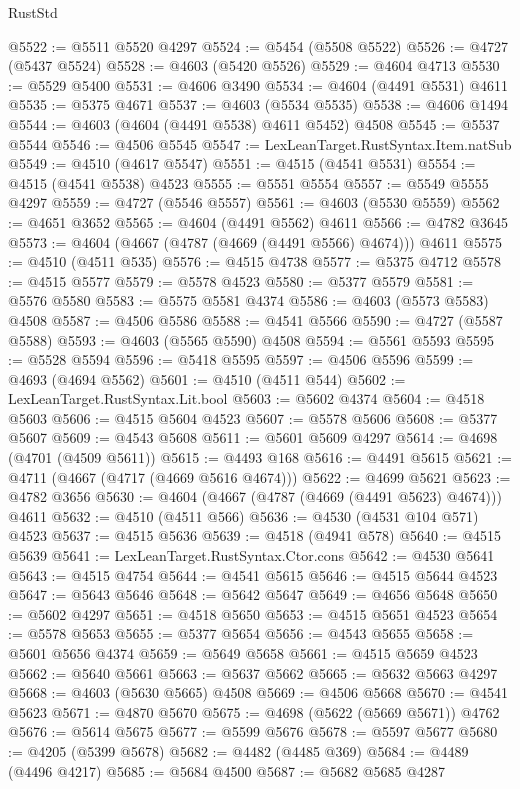 \begin{lexlean}{RustStd}
\begin{coremodule}
@5522 := @5511 @5520 @4297
@5524 := @5454 (@5508 @5522)
@5526 := @4727 (@5437 @5524)
@5528 := @4603 (@5420 @5526)
@5529 := @4604 @4713
@5530 := @5529 @5400
@5531 := @4606 @3490
@5534 := @4604 (@4491 @5531) @4611
@5535 := @5375 @4671
@5537 := @4603 (@5534 @5535)
@5538 := @4606 @1494
@5544 := @4603 (@4604 (@4491 @5538) @4611 @5452) @4508
@5545 := @5537 @5544
@5546 := @4506 @5545
@5547 := LexLeanTarget.RustSyntax.Item.natSub
@5549 := @4510 (@4617 @5547)
@5551 := @4515 (@4541 @5531)
@5554 := @4515 (@4541 @5538) @4523
@5555 := @5551 @5554
@5557 := @5549 @5555 @4297
@5559 := @4727 (@5546 @5557)
@5561 := @4603 (@5530 @5559)
@5562 := @4651 @3652
@5565 := @4604 (@4491 @5562) @4611
@5566 := @4782 @3645
@5573 := @4604 (@4667 (@4787 (@4669 (@4491 @5566) @4674))) @4611
@5575 := @4510 (@4511 @535)
@5576 := @4515 @4738
@5577 := @5375 @4712
@5578 := @4515 @5577
@5579 := @5578 @4523
@5580 := @5377 @5579
@5581 := @5576 @5580
@5583 := @5575 @5581 @4374
@5586 := @4603 (@5573 @5583) @4508
@5587 := @4506 @5586
@5588 := @4541 @5566
@5590 := @4727 (@5587 @5588)
@5593 := @4603 (@5565 @5590) @4508
@5594 := @5561 @5593
@5595 := @5528 @5594
@5596 := @5418 @5595
@5597 := @4506 @5596
@5599 := @4693 (@4694 @5562)
@5601 := @4510 (@4511 @544)
@5602 := LexLeanTarget.RustSyntax.Lit.bool
@5603 := @5602 @4374
@5604 := @4518 @5603
@5606 := @4515 @5604 @4523
@5607 := @5578 @5606
@5608 := @5377 @5607
@5609 := @4543 @5608
@5611 := @5601 @5609 @4297
@5614 := @4698 (@4701 (@4509 @5611))
@5615 := @4493 @168
@5616 := @4491 @5615
@5621 := @4711 (@4667 (@4717 (@4669 @5616 @4674)))
@5622 := @4699 @5621
@5623 := @4782 @3656
@5630 := @4604 (@4667 (@4787 (@4669 (@4491 @5623) @4674))) @4611
@5632 := @4510 (@4511 @566)
@5636 := @4530 (@4531 @104 @571) @4523
@5637 := @4515 @5636
@5639 := @4518 (@4941 @578)
@5640 := @4515 @5639
@5641 := LexLeanTarget.RustSyntax.Ctor.cons
@5642 := @4530 @5641
@5643 := @4515 @4754
@5644 := @4541 @5615
@5646 := @4515 @5644 @4523
@5647 := @5643 @5646
@5648 := @5642 @5647
@5649 := @4656 @5648
@5650 := @5602 @4297
@5651 := @4518 @5650
@5653 := @4515 @5651 @4523
@5654 := @5578 @5653
@5655 := @5377 @5654
@5656 := @4543 @5655
@5658 := @5601 @5656 @4374
@5659 := @5649 @5658
@5661 := @4515 @5659 @4523
@5662 := @5640 @5661
@5663 := @5637 @5662
@5665 := @5632 @5663 @4297
@5668 := @4603 (@5630 @5665) @4508
@5669 := @4506 @5668
@5670 := @4541 @5623
@5671 := @4870 @5670
@5675 := @4698 (@5622 (@5669 @5671)) @4762
@5676 := @5614 @5675
@5677 := @5599 @5676
@5678 := @5597 @5677
@5680 := @4205 (@5399 @5678)
@5682 := @4482 (@4485 @369)
@5684 := @4489 (@4496 @4217)
@5685 := @5684 @4500
@5687 := @5682 @5685 @4287

\end{coremodule}
\end{lexlean}
